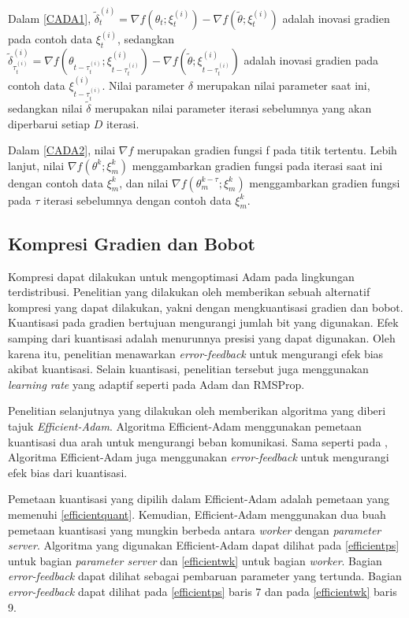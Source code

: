 Dalam \autoref{CADA1}, $\tilde{\delta}_t^{(i)} = \nabla f(\theta_t;\xi_t^{(i)}) - \nabla f(\tilde{\theta};\xi_t^{(i)})$ adalah inovasi gradien pada contoh data $\xi_t^{(i)}$, sedangkan $\tilde{\delta}_{\tau_t^{(i)}}^{(i)} = \nabla f(\theta_{t-\tau_t^{(i)}};\xi_{t-\tau_t^{(i)}}^{(i)}) - \nabla f(\tilde{\theta};\xi_{t-\tau_t^{(i)}}^{(i)})$ adalah inovasi gradien pada contoh data $\xi_{t-\tau_t^{(i)}}^{(i)}$. Nilai parameter $\delta$ merupakan nilai parameter saat ini, sedangkan nilai $\tilde{\delta}$ merupakan nilai parameter iterasi sebelumnya yang akan diperbarui setiap $D$ iterasi.

Dalam \autoref{CADA2}, nilai $\nabla f$ merupakan gradien fungsi f pada titik tertentu. Lebih lanjut, nilai $\nabla f(\theta^k;\xi^k_m)$ menggambarkan gradien fungsi pada iterasi saat ini dengan contoh data $\xi^k_m$, dan nilai $\nabla f(\theta^{k-\tau}_m;\xi^k_m)$ menggambarkan gradien fungsi pada $\tau$ iterasi sebelumnya dengan contoh data $\xi^k_m$.

\subsection{Kompresi Gradien dan Bobot}
Kompresi dapat dilakukan untuk mengoptimasi Adam pada lingkungan terdistribusi. Penelitian yang dilakukan oleh \textcite{Chen2021CADA} memberikan sebuah alternatif kompresi yang dapat dilakukan, yakni dengan mengkuantisasi gradien dan bobot. Kuantisasi pada gradien bertujuan mengurangi jumlah bit yang digunakan. Efek samping dari kuantisasi adalah menurunnya presisi yang dapat digunakan. Oleh karena itu, penelitian \textcite{Chen2021CADA} menawarkan \emph{error-feedback} untuk mengurangi efek bias akibat kuantisasi. Selain kuantisasi, penelitian tersebut juga menggunakan \emph{learning rate} yang adaptif seperti pada Adam dan RMSProp.

Penelitian selanjutnya yang dilakukan oleh \textcite{Chen2022Efficient} memberikan algoritma yang diberi tajuk \emph{Efficient-Adam}. Algoritma Efficient-Adam menggunakan pemetaan kuantisasi dua arah untuk mengurangi beban komunikasi. Sama seperti pada \textcite{Chen2021CADA}, Algoritma Efficient-Adam juga menggunakan \emph{error-feedback} untuk mengurangi efek bias dari kuantisasi.

Pemetaan kuantisasi yang dipilih dalam Efficient-Adam adalah pemetaan yang memenuhi \autoref{efficientquant}. Kemudian, Efficient-Adam menggunakan dua buah pemetaan kuantisasi yang mungkin berbeda antara \emph{worker} dengan \emph{parameter server}. Algoritma yang digunakan Efficient-Adam dapat dilihat pada \autoref{efficientps} untuk bagian \emph{parameter server} dan \autoref{efficientwk} untuk bagian \emph{worker}. Bagian \emph{error-feedback} dapat dilihat sebagai pembaruan parameter yang tertunda. Bagian \emph{error-feedback} dapat dilihat pada \autoref{efficientps} baris 7 dan pada \autoref{efficientwk} baris 9.

